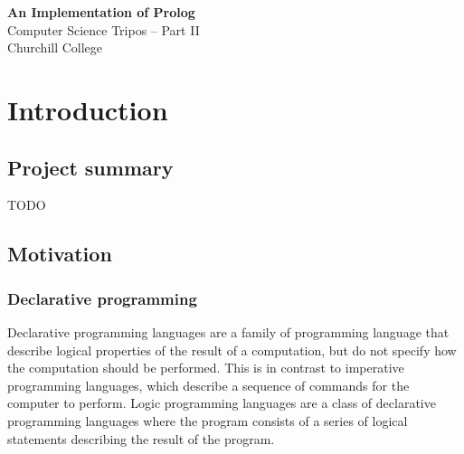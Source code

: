 \documentclass[12pt,a4paper]{report}
\begin{document}

\pagestyle{none}


\vspace*{60mm}
\begin{center}
{\Huge  \bfseries An Implementation of Prolog} \\[5mm]
{\Large Computer Science Tripos -- Part II \\[5mm]
Churchill College}
\end{center}

\newpage
\pagestyle{normal}

\tableofcontents






\chapter{Introduction}

\section{Project summary}

TODO

\section{Motivation}

\subsection{Declarative programming}

Declarative programming languages are a family of programming language that describe logical properties of the result of a computation, but do not specify how the computation should be performed. This is in contrast to imperative programming languages, which describe a sequence of commands for the computer to perform. Logic programming languages are a class of declarative programming languages where the program consists of a series of logical statements describing the result of the program.
\end{document}
